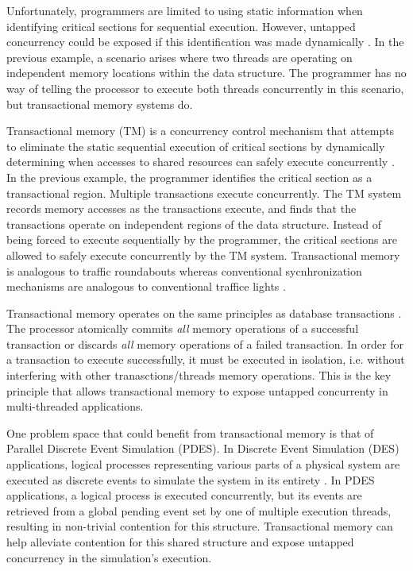 \documentclass[a4paper]{article}
\begin{document}

\indent Unfortunately, programmers are limited to using static information when
identifying critical sections for sequential execution.  However, untapped
concurrency could be exposed if this identification was made dynamically
\cite{intel_prog_ref}.  In the previous example, a scenario arises where two
threads are operating on independent memory locations within the data structure.
The programmer has no way of telling the processor to execute both threads
concurrently in this scenario, but transactional memory systems do. \par

\indent Transactional memory (TM) is a concurrency control mechanism that
attempts to eliminate the static sequential execution of critical sections by
dynamically determining when accesses to shared resources can safely execute
concurrently \cite{sle_rajwar}.  In the previous example, the programmer
identifies the critical section as a transactional region. Multiple transactions
execute concurrently.  The TM system records memory accesses as the transactions
execute, and finds that the transactions operate on independent regions of the
data structure.  Instead of being forced to execute sequentially by the
programmer, the critical sections are allowed to safely execute concurrently by
the TM system.  Transactional memory is analogous to traffic roundabouts whereas
conventional sycnhronization mechanisms are analogous to conventional traffice
lights \cite{neuling_vid}. \par

\indent Transactional memory operates on the same principles as database
transactions \cite{tm_2nd}.  The processor atomically commits \textit{all}
memory operations of a successful transaction or discards \textit{all} memory
operations of a failed transaction.  In order for a transaction to execute
successfully, it must be executed in isolation, i.e. without interfering with
other tranasctions/threads memory operations.  This is the key principle that
allows transactional memory to expose untapped concurrenty in multi-threaded
applications.\par 

\indent One problem space that could benefit from transactional memory is that of
Parallel Discrete Event Simulation (PDES).  In Discrete Event Simulation (DES)
applications, logical processes representing various parts of a physical system
are executed as discrete events to simulate the system in its entirety
\cite{fujimoto}.  In PDES applications, a logical process is executed
concurrently, but its events are retrieved from a global pending event set by
one of multiple execution threads, resulting in non-trivial contention for this
structure.  Transactional memory can help alleviate contention for this shared
structure and expose untapped concurrency in the simulation's execution.\par
\end{document}
